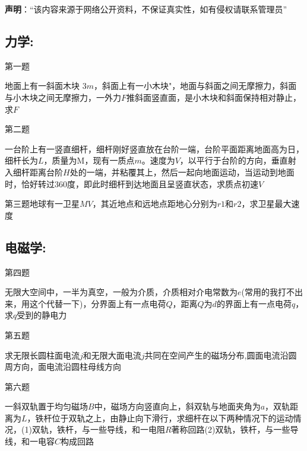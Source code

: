 
\textbf{声明}：“该内容来源于网络公开资料，不保证真实性，如有侵权请联系管理员”

\subsection{力学:}
第一题

地面上有一斜面木块 $3m$，斜面上有一小木块"，地面与斜面之间无摩擦力，斜面与小木块之间无摩擦力，一外力$F$推斜面竖直面，是小木块和斜面保持相对静止，求$F$

第二题

一台阶上有一竖直细杆，细杆刚好竖直放在台阶一端，台阶平面距离地面高为日，细杆长为$L$，质量为M，现有一质点$m$。速度为$V$，以平行于台阶的方向，垂直射入细杆距离台阶$H$处的一端，并粘覆其上，然后一起向地面运动，当运动到地面时，恰好转过360度，即此时细杆到达地面且呈竖直状态，求质点初速$V$

第三题地球有一卫星$MV$，其近地点和远地点距地心分别为$r1$和$r2$，求卫星最大速度
\subsection{电磁学:}
第四题

无限大空间中，一半为真空，一般为介质，介质相对介电常数为$e$(常用的我打不出来，用这个代替一下)，分界面上有一点电荷$Q$，距离$Q$为$d$的界面上有一点电荷$q$，求$q$受到的静电力

第五题

求无限长圆柱面电流$j$和无限大面电流$j$共同在空间产生的磁场分布,圆面电流沿圆周方向，面电流沿圆柱母线方向

第六题

一斜双轨置于均匀磁场$B$中，磁场方向竖直向上，斜双轨与地面夹角为$a$，双轨距离为$L$，铁杆位于双轨之上，由静止向下滑行，求细杆在以下两种情况下的运动情况，(1)双轨，铁杆，与一些导线，和一电阻$R$著称回路(2)双轨，铁杆，与一些导线，和一电容$C$构成回路
